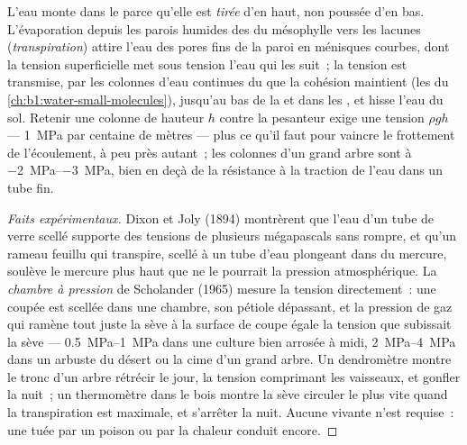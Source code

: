 \begin{theorem}\label{thm:b1:plant-transport:cohesiontension}
L'eau monte dans le  parce qu'elle est \emph{tirée} d'en haut,
non poussée d'en bas. L'évaporation depuis les parois humides des
 du mésophylle vers les lacunes (\emph{transpiration}) attire
l'eau des pores fins de la paroi en ménisques courbes, dont la tension
superficielle met sous tension l'eau qui les suit~; la tension est
transmise, par les colonnes d'eau continues du  que la cohésion
maintient (les  du
\cref{ch:b1:water-small-molecules}), jusqu'au bas de la  et dans
les , et hisse l'eau du sol. Retenir une colonne de hauteur $h$
contre la pesanteur exige une tension $\rho g h$ --- \qty{1}{MPa} par
centaine de mètres --- plus ce qu'il faut pour vaincre le frottement de
l'écoulement, à peu près autant~; les colonnes d'un grand arbre sont à
\qtyrange{-2}{-3}{MPa}, bien en deçà de la résistance à la traction de
l'eau dans un tube fin.
\end{theorem}
\begin{proof}[Faits expérimentaux]
Dixon et Joly (1894) montrèrent que l'eau d'un tube de verre scellé
supporte des tensions de plusieurs mégapascals sans rompre, et qu'un
rameau feuillu qui transpire, scellé à un tube d'eau plongeant dans du
mercure, soulève le mercure plus haut que ne le pourrait la pression
atmosphérique. La \emph{chambre à pression} de Scholander (1965) mesure
la tension directement~: une  coupée est scellée dans une
chambre, son pétiole dépassant, et la pression de gaz qui ramène tout
juste la sève à la surface de coupe égale la tension que subissait la
sève --- \qtyrange{0.5}{1}{MPa} dans une culture bien arrosée à midi,
\qtyrange{2}{4}{MPa} dans un arbuste du désert ou la cime d'un grand
arbre. Un dendromètre montre le tronc d'un arbre rétrécir le jour, la
tension comprimant les vaisseaux, et gonfler la nuit~; un thermomètre
dans le bois montre la sève circuler le plus vite quand la
transpiration est maximale, et s'arrêter la nuit. Aucune 
vivante n'est requise~: une  tuée par un poison ou par la chaleur
conduit encore.
\end{proof}

